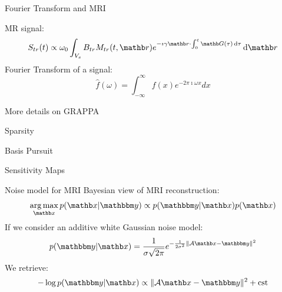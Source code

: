 \begin{frame}{Fourier Transform and MRI}
    \begin{multicols}{2}
        MR signal:
        \begin{equation*}
            \vspace{\baselineskip}
            S_{tr}(t) \propto \omega_0  \int_{V_s} B_{tr} M_{tr}(t, \rb) e^{-\imath \gamma \rb \cdot \int_0^t \Gb(\tau)  \dif \tau} \dif \rb
        \end{equation*}
        \newpage
        Fourier Transform of a signal:
        \begin{equation*}
            \hat{f}(\omega) = \int_{-\infty}^{\infty} f(x) e^{-2\pi \imath \omega x} dx
        \end{equation*}
    \end{multicols}
\end{frame}

\begin{frame}{More details on GRAPPA}

\end{frame}

\begin{frame}{Sparsity}

\end{frame}

\begin{frame}{Basis Pursuit}

\end{frame}

\begin{frame}{Sensitivity Maps}

\end{frame}

\begin{frame}{Noise model for MRI}
    Bayesian view of MRI reconstruction:
    \begin{equation*}
        \argmax_{\xb} p(\xb|\ybb) \propto p(\ybb|\xb) p(\xb)
    \end{equation*}
    If we consider an additive white Gaussian noise model:
    \begin{equation*}
        p(\ybb|\xb) = \frac{1}{\sigma \sqrt{2\pi}} e^{-\frac{1}{2\sigma^2} \|\mathcal{A}\xb - \ybb \| ^2 }
    \end{equation*}
    We retrieve:
    \begin{equation*}
        - \log p(\ybb|\xb) \propto \|\mathcal{A}\xb - \ybb \| ^2 + \text{cst}
    \end{equation*}
\end{frame}

